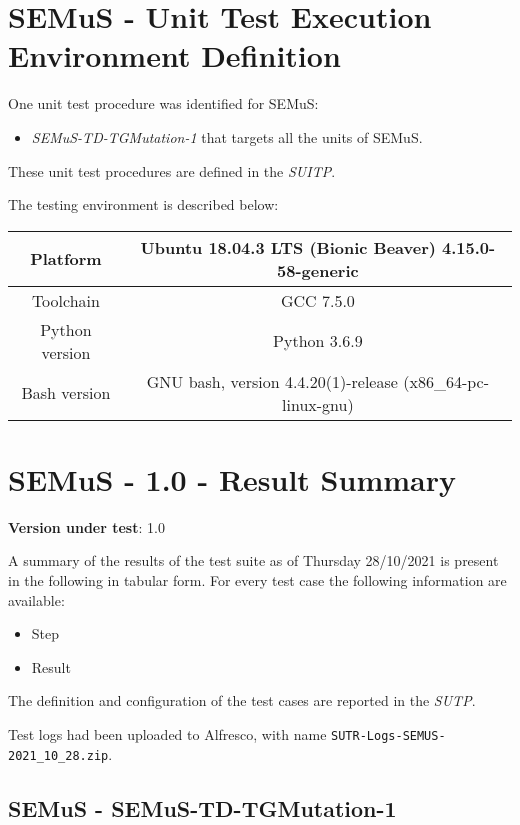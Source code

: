 
\chapter{SEMuS - Unit Test Execution Environment Definition}

One unit test procedure was identified for SEMuS:
\begin{itemize}
  \item {\emph{SEMuS-TD-TGMutation-1} that targets all the units of SEMuS}.
\end{itemize}

These unit test procedures are defined in the \emph{SUITP}.

The testing environment is described below:

\begin{center}
\begin{tabular}{ |c|c| }
 \hline
 Platform & Ubuntu 18.04.3 LTS (Bionic Beaver) 4.15.0-58-generic \\
 \hline
 Toolchain & GCC 7.5.0 \\
 \hline
 Python version & Python 3.6.9 \\
 \hline
 Bash version & GNU bash, version 4.4.20(1)-release (x86\_64-pc-linux-gnu) \\
 \hline
\end{tabular}
\end{center}


\chapter{SEMuS - 1.0 - Result Summary}

\textbf{Version under test}: 1.0

A summary of the results of the test suite as of Thursday 28/10/2021 is present in the following in tabular form.
For every test case the following information are available:
\begin{itemize}
  \item Step
  \item Result
\end{itemize}

The definition and configuration of the test cases are reported in the \emph{SUTP}.

Test logs had been uploaded to Alfresco, with name \texttt{SUTR-Logs-SEMUS-2021\_10\_28.zip}.

\section{SEMuS - SEMuS-TD-TGMutation-1}



\clearpage
